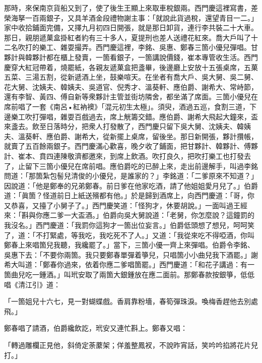 那時，來保南京貨船又到了，使了後生王顯上來取車稅銀兩。西門慶這裡寫書，差榮海拏一百兩銀子，又具羊酒金段禮物謝主事：「就說此貨過稅，還望青目一二。」家中收拾鋪面完備，又擇九月初四日開張，就是那日卸貨，連行李共裝二十大車。那日，親朋遞菓盒掛紅者約有三十多人，夏提刑也差人送禮花紅來。喬大戶叫了十二名吹打的樂工、雜耍撮弄。西門慶這裡，李銘、吳惠、鄭春三箇小優兒彈唱。甘夥計與韓夥計都在櫃上發賣，一箇看銀子，一箇講說價錢，崔本專管收生活。西門慶穿大紅冠帶着，燒罷紙，{}各親友遞菓盒把盞畢，後邊廳上安放十五張桌席，五菓五菜、三湯五割，從新遞酒上坐，鼓樂喧天。在坐者有喬大戶、吳大舅、吳二舅、花大舅、沈姨夫、韓姨夫、吳道官、倪秀才、溫葵軒、應伯爵、謝希大、常峙節，還有李智、黃四、傅自新等衆夥計主管並街坊隣舍，都坐滿了席面。三箇小優兒在席前唱了一套《南呂•紅衲襖》「混元初生太極」。{}須臾，酒過五巡，食割三道，下邊樂工吹打彈唱，雜耍百戲過去，席上觥籌交錯。應伯爵、謝希大飛起大鐘來，盃來盞去。飲至日落時分，把衆人打發散了，西門慶只留下吳大舅、沈姨夫、韓姨夫、溫葵軒、應伯爵、謝希大，從新擺上桌席，留後坐。那日新開張，夥計攢帳，就賣了五百餘兩銀子。西門慶滿心歡喜，晚夕收了鋪面，把甘夥計、韓夥計、傅夥計、崔本、賁四連陳敬濟都邀來，到席上飲酒。吹打良久，把吹打樂工也打發去了，止留下三箇小優兒在席前唱。應伯爵吃的已醉上來，走出前邊解手，叫過李銘問道：「那箇紮包髻兒清俊的小優兒，是誰家的？」李銘道：「二爹原來不知道？」因說道：「他是鄭奉的兄弟鄭春。前日爹在他家吃酒，請了他姐姐愛月兒了。」伯爵道：「眞箇？怪道前日上紙送殯都有他。」於是歸到酒席上，向西門慶道：「哥，你又恭喜，又擡了小舅子了。」西門慶笑道：「怪狗才，休要胡說。」一面叫過王經來：「斟與你應二爹一大盃酒。」伯爵向吳大舅說道：「老舅，你怎麼說？這鐘罰的我沒名。」西門慶道：「我罰你這狗才一箇出位妄言。」伯爵低頭想了想兒，呵呵笑了，道：「不打緊處，等我吃，我吃死不了人。」又道：「我從來吃不得啞酒，你叫鄭春上來唱箇兒我聽，我纔罷了。」當下，三箇小優一齊上來彈唱。伯爵令李銘、吳惠下去：「不要你兩箇。我只要鄭春單彈着箏兒，只唱箇小小曲兒我下酒罷。」{}謝希大叫道：「鄭春你過來，依着你應二爹唱箇罷。」西門慶道：「和花子講過：有一箇曲兒吃一鍾酒。」叫玳安取了兩箇大銀鍾放在應二面前。那鄭春款按銀箏，低低唱《清江引》道：{}

\begin{myquote}
「一箇姐兒十六七，見一對蝴蝶戲。香肩靠粉墻，春筍彈珠淚。喚梅香趕他去別處飛。」
\end{myquote}

鄭春唱了請酒，伯爵纔飲訖，玳安又連忙斟上。鄭春又唱：

\begin{myquote}
「轉過雕欄正見他，斜倚定荼䕷架；佯羞整鳳衩，不說昨宵話，笑吟吟掐將花片兒打。」{}
\end{myquote}

